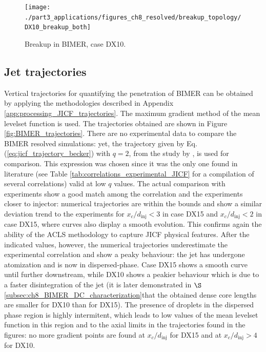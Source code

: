 \begin{figure}[ht]
\centering
\texttt{[image: ./part3\_applications/figures\_ch8\_resolved/breakup\_topology/DX10\_breakup\_both]}
\caption{Breakup in BIMER, case DX10. }
\label{fig:BIMER_breakup_topology}
\end{figure}

\subsection{Jet trajectories}

Vertical trajectories for quantifying the penetration of BIMER can be obtained by applying the methodologies described in Appendix \ref{app:processing_JICF_trajectories}. The maximum gradient method of the mean levelset function is used. The trajectories obtained are shown in Figure \ref{fig:BIMER_trajectories}. There are no experimental data to compare the BIMER resolved simulations: yet, the trajectory given by Eq. (\ref{eq:jicf_trajectory_becker}) with $q = 2$, from the study by , is used for comparison. This expression was chosen since it was the only one found in literature (see Table \ref{tab:correlations_experimental_JICF} for a compilation of several correlations) valid at low $q$ values. The actual comparison with experiments show a good match among the correlation and the experiments closer to injector: numerical trajectories are within the bounds and show a similar deviation trend to the experiments for $x_c/d_\mathrm{inj} < 3$ in case DX15 and $x_c/d_\mathrm{inj} < 2$ in case DX15, where curves also display a smooth evolution. This confirms again the ability of the ACLS methodology to capture JICF physical features. After the indicated values, however, the numerical trajectories underestimate the experimental correlation and show a peaky behaviour: the jet has undergone atomization and is now in dispersed-phase. Case DX15 shows a smooth curve until further downstream, while DX10 shows a peakier behaviour which is due to a faster disintegration of the jet (it is later demonstrated in $\S$\ref{subsec:ch8_BIMER_DC_characterization}that the obtained dense core lengths are smaller for DX10 than for DX15). The presence of droplets in the dispersed phase region is highly intermitent, which leads to low values of the mean levelset function in this region and to the axial limits in the trajectories found in the figures: no more gradient points are found at $x_c / d_\mathrm{inj}$ for DX15 and at $x_c / d_\mathrm{inj} > 4$ for DX10.


